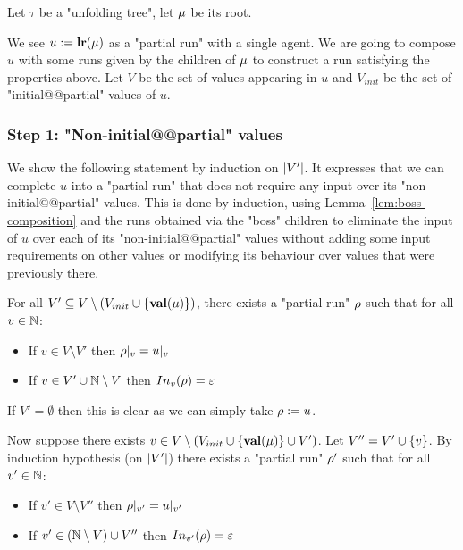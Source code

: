 	Let $\tau$ be a "unfolding tree", let $\node$ be its root.
	
	We see $u := \localrunlabel{\node}$ as a "partial run" with a single agent.
	We are going to compose $u$ with some runs given by the children of $\node$ to construct a run satisfying the properties above.
	Let $V$ be the set of values appearing in $u$ and $V_{init}$ be the set of "initial@@partial" values of $u$.
	
	
	\subsubsection{Step 1: "Non-initial@@partial" values}
	\label{sec:tree-to-run-step-one}
	
	We show the following statement by induction on $\size{V'}$. It expresses that we can complete $u$ into a "partial run" that does not require any input over its "non-initial@@partial" values. This is done by induction, using Lemma~\ref{lem:boss-composition} and the runs obtained via the "boss" children to eliminate the input of $u$ over each of its "non-initial@@partial" values without adding some input requirements on other values or modifying its behaviour over values that were previously there.
	
For all $V' \subseteq V \setminus (V_{init}\cup \set{\valuelabel{\node}})$, there exists a "partial run" $\run$ such that for all $v \in \nats$:
\begin{itemize}
	\item If $v \in V \setminus V'$ then $\vproj{v}{\run} = \vproj{v}{u}$
	
	\item If $v \in V' \cup \nats \setminus V$ then $\vinput{v}{\run} = \epsilon$
\end{itemize}  
	
	If $V' = \emptyset$ then this is clear as we can simply take $\run := \localrun$.
	
	Now suppose there exists $v \in V \setminus (V_{init}\cup \set{\valuelabel{\node}} \cup V')$. Let $V'' = V' \cup \set{v}$. By induction hypothesis (on $\size{V'}$) there exists a "partial run" $\run'$ such that for all $v' \in \nats$:
	\begin{itemize}
		\item If $v' \in V \setminus V''$ then $\vproj{v'}{\run} = \vproj{v'}{u}$
		
		\item If $v' \in (\nats \setminus V) \cup V''$ then $\vinput{v'}{\run} = \epsilon$
	\end{itemize}

